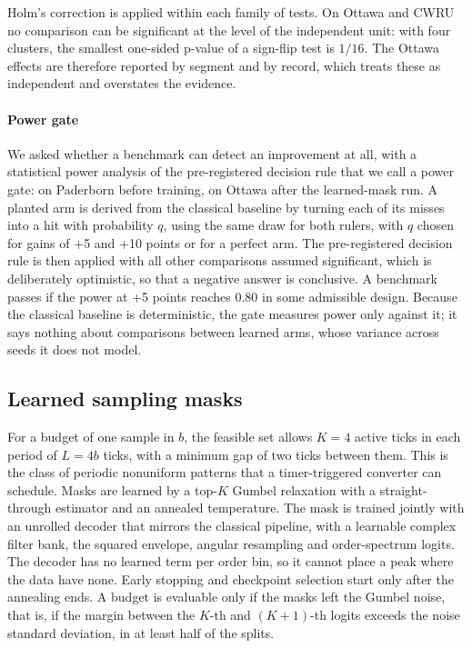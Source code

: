 Holm's correction is applied within each family of tests. On Ottawa and CWRU no comparison can be
significant at the level of the independent unit: with four clusters, the smallest one-sided p-value
of a sign-flip test is $1/16$. The Ottawa effects are therefore reported by segment and by record,
which treats these as independent and overstates the evidence.

\paragraph{Power gate}
We asked whether a benchmark can detect an improvement at all, with a statistical power analysis of
the pre-registered decision rule that we call a power gate: on Paderborn before training, on Ottawa
after the learned-mask run. A planted arm is derived from the classical baseline by turning each of
its misses into a hit with probability $q$, using the same draw for both rulers, with $q$ chosen for
gains of +5 and +10 points or for a perfect arm. The pre-registered decision rule is then applied
with all other comparisons assumed significant, which is deliberately optimistic, so that a
negative answer is conclusive. A benchmark passes if the power at +5 points reaches 0.80 in some
admissible design. Because the classical baseline is deterministic, the gate measures power only
against it; it says nothing about comparisons between learned arms, whose variance across seeds it
does not model.

\subsection{Learned sampling masks}
\label{sec:masks}

For a budget of one sample in $b$, the feasible set allows $K = 4$ active ticks in each period of
$L = 4b$ ticks, with a minimum gap of two ticks between them. This is the class of periodic
nonuniform patterns that a timer-triggered converter can schedule. Masks are learned by a top-$K$
Gumbel relaxation with a straight-through estimator and an annealed temperature. The mask is
trained jointly with an unrolled decoder \citep{monga2021unrolling} that mirrors the classical
pipeline, with a learnable complex filter bank, the squared envelope, angular resampling and
order-spectrum logits. The decoder has no learned term per order bin, so it cannot place a peak
where the data have none. Early stopping and checkpoint selection start only after the annealing
ends. A budget is evaluable only if the masks left the Gumbel noise, that is, if the margin between
the $K$-th and $(K{+}1)$-th logits exceeds the noise standard deviation, in at least half of the
splits.


